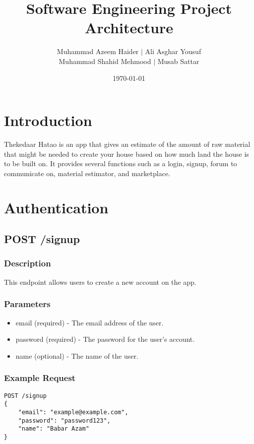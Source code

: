 \documentclass{article}
\title{Software Engineering Project Architecture}
\author{Muhammad Azeem Haider $\mid$ Ali Asghar Yousuf \\
      Muhammad Shahid Mehmood $\mid$ Musab Sattar}
\date{\today}
\begin{document}
\maketitle

\section{Introduction}

Thekedaar Hatao is an app that gives an estimate of the amount of raw material that might be needed to create your house based on how much land the house is to be built on. It provides several functions such as a login, signup, forum to communicate on, material estimator, and marketplace.

\section{Authentication}

\subsection{POST /signup}

\subsubsection{Description}

This endpoint allows users to create a new account on the app.

\subsubsection{Parameters}

\begin{itemize}
\item email (required) - The email address of the user.
\item password (required) - The password for the user's account.
\item name (optional) - The name of the user.
\end{itemize}

\subsubsection{Example Request}

\begin{verbatim}
POST /signup
{
    "email": "example@example.com",
    "password": "password123",
    "name": "Babar Azam"
}
\end{verbatim}
\end{document}
